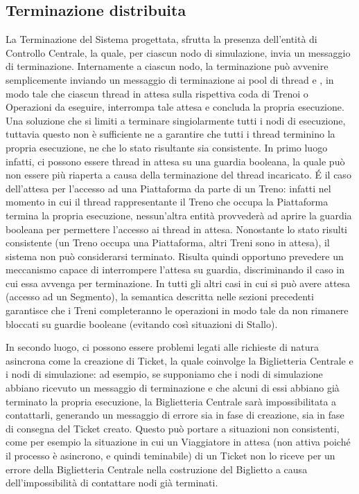 \newpage
\subsection{Terminazione distribuita}\label{sec:distributed_termination}

La Terminazione del Sistema progettata, sfrutta la presenza dell'entità di Controllo Centrale, la quale, per ciascun nodo di simulazione, invia un messaggio di terminazione. Internamente a ciascun nodo, la terminazione può avvenire semplicemente inviando un messaggio di terminazione ai pool di thread  e , in modo tale che ciascun thread in attesa sulla rispettiva coda di Trenoi o Operazioni da eseguire, interrompa tale attesa e concluda la propria esecuzione. Una soluzione che si limiti a terminare singiolarmente tutti i nodi di esecuzione, tuttavia questo non è sufficiente ne a garantire che tutti i thread terminino la propria esecuzione, ne che lo stato risultante sia consistente. In primo luogo infatti, ci possono essere thread in attesa su una guardia booleana, la quale può non essere più riaperta a causa della terminazione del thread incaricato. \'E il caso dell'attesa per l'accesso ad una Piattaforma da parte di un Treno: infatti nel momento in cui il thread rappresentante il Treno che occupa la Piattaforma termina la propria esecuzione, nessun'altra entità provvederà ad aprire la guardia booleana per permettere l'accesso ai thread in attesa. Nonostante lo stato risulti consistente (un Treno occupa una Piattaforma, altri Treni sono in attesa), il sistema non può considerarsi terminato. Risulta quindi opportuno prevedere un meccanismo capace di interrompere l'attesa su guardia, discriminando il caso in cui essa avvenga per terminazione. In tutti gli altri casi in cui si può avere attesa (accesso ad un Segmento), la semantica descritta nelle sezioni precedenti garantisce che i Treni completeranno le operazioni in modo tale da non rimanere bloccati su guardie booleane (evitando così situazioni di Stallo).

	In secondo luogo, ci possono essere problemi legati alle richieste di natura asincrona come la creazione di Ticket, la quale coinvolge la Biglietteria Centrale e i nodi di simulazione: ad esempio, se supponiamo che i nodi di simulazione abbiano ricevuto un messaggio di terminazione e che alcuni di essi abbiano già terminato la propria esecuzione, la Biglietteria Centrale sarà impossibilitata a contattarli, generando un messaggio di errore sia in fase di creazione, sia in fase di consegna del Ticket creato. Questo può portare a situazioni non consistenti, come per esempio la situazione in cui un Viaggiatore in attesa (non attiva poiché il processo è asincrono, e quindi teminabile) di un Ticket non lo riceve per un errore della Biglietteria Centrale nella costruzione del Biglietto a causa dell'impossibilità di contattare nodi già terminati.
	
